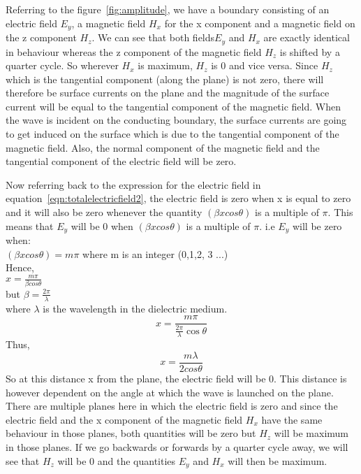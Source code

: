 Referring to the figure~\ref{fig:amplitude}, we have a boundary consisting of an electric field $E_y$, a magnetic field $H_x$ for the x component and a magnetic field on the z component $H_z$. We can see that both fields$ E_y$ and $H_x$ are exactly identical in behaviour whereas the z component of the magnetic field $H_z$ is shifted by a quarter cycle. So wherever $H_x$ is maximum, $H_z$ is 0 and vice versa. Since $H_z$ which is the tangential component (along the plane) is not zero, there will therefore be surface currents on the plane and the magnitude of the surface current will be equal to the tangential component of the magnetic field. When the wave is incident on the conducting boundary, the surface currents are going to get induced on the surface which is due to the tangential component of the magnetic field. Also, the normal component of the magnetic field and the tangential component of the electric field will be zero.

Now referring back to the expression for the electric field in equation~\ref{eqn:totalelectricfield2}, the electric field is zero when x is equal to zero and it will also be zero whenever the quantity $(\beta xcos\theta)$ is a multiple of $\pi$. This means that $E_y$ will be 0 when $(\beta xcos\theta)$ is a multiple of $\pi$. i.e $E_y$ will be zero when:\\
$(\beta xcos\theta) = m\pi$     where m is an integer (0,1,2, 3 ...)\\ 
Hence,\\
$ x = \frac{m\pi}{\beta cos\theta}$   \\ 
but $\beta = \frac{2\pi}{\lambda}$ \\
where $\lambda$ is the wavelength in the dielectric medium.
\begin{equation*}
x =\frac{m\pi}{\frac{2\pi}{\lambda}\cos\theta}
\end{equation*} 
Thus,
\begin{equation}
x = \frac{m\lambda}{2cos\theta}
\end{equation}
So at this distance x from the plane, the electric field will be 0. This distance is however dependent on the angle at which the wave is launched on the plane. There are multiple planes here in which the electric field is zero and since the electric field and the x component of the magnetic field $H_x$ have the same behaviour in those planes, both quantities will be zero but $H_z$ will be maximum in those planes. If we go backwards or forwards by a quarter cycle away, we will see that $H_z$ will be 0 and the quantities $E_y$ and $H_x$ will then be maximum.

